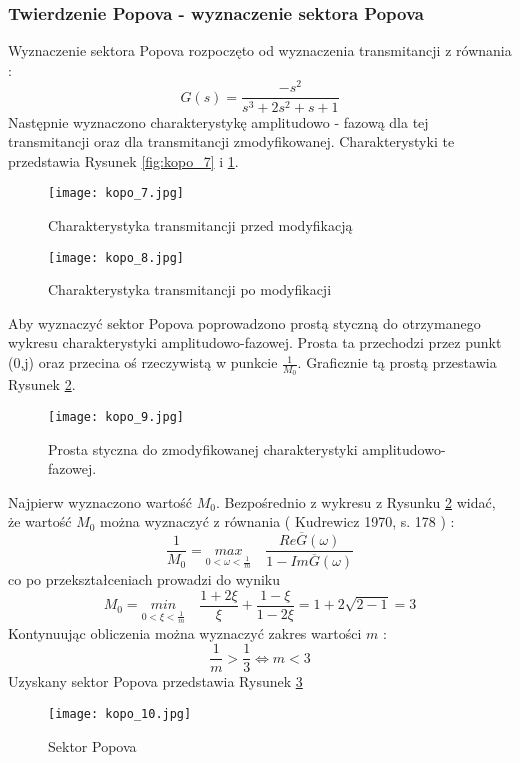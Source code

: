 \documentclass[a4paper,11pt]{article}
\begin{document}
\subsubsection{Twierdzenie Popova - wyznaczenie sektora Popova}
Wyznaczenie sektora Popova rozpoczęto od wyznaczenia transmitancji z równania : 
\begin{equation*}
G(s) = \frac{-s^{2}}{s^{3}+2s^{2}+s+1}
\end{equation*}
Następnie wyznaczono charakterystykę amplitudowo - fazową dla tej transmitancji oraz dla transmitancji zmodyfikowanej. 
Charakterystyki te przedstawia Rysunek \ref{fig:kopo_7} i \ref{fig:kopo_8}.
\begin{figure}[H]
  \centering
  \begin{minipage}[b]{0.47\textwidth}
    \texttt{[image: kopo\_7.jpg]}
    \caption{Charakterystyka transmitancji przed modyfikacją}
    \label{fig:kopo_7}
  \end{minipage}
  \hfill
  \begin{minipage}[b]{0.47\textwidth}
    \texttt{[image: kopo\_8.jpg]}
    \caption{Charakterystyka transmitancji po modyfikacji}
    \label{fig:kopo_8}
  \end{minipage}
\end{figure}
Aby wyznaczyć sektor Popova poprowadzono prostą styczną do otrzymanego wykresu charakterystyki amplitudowo-fazowej. Prosta ta przechodzi przez punkt (0,j) oraz przecina oś rzeczywistą w punkcie \( \frac{1}{M_{0}} \). Graficznie tą prostą przestawia Rysunek \ref{fig:kopo_9}.
\begin{figure}[H]
\centerline{\texttt{[image: kopo\_9.jpg]}}
\centering
\caption{Prosta styczna do zmodyfikowanej charakterystyki amplitudowo-fazowej.  }
\label{fig:kopo_9}
\end{figure}
Najpierw wyznaczono wartość \( M_{0} \). Bezpośrednio z wykresu z Rysunku \ref{fig:kopo_9} widać, że wartość \( M_{0} \) można wyznaczyć z równania ( Kudrewicz 1970, s. 178 ) :
\begin{equation*}
\frac{1}{M_{0}}=\underset{0<\omega< \frac{1}{m}}{max} \quad \frac{Re\overline{G}(\omega)}{1-Im\overline{G}(\omega)}
\end{equation*}
co po przekształceniach prowadzi do wyniku 
\begin{equation*}
M_{0}=\underset{0<\xi< \frac{1}{m}}{min} \quad \frac{1+2\xi}{\xi}+\frac{1-\xi}{1-2\xi}=1+2\sqrt{2-1} = 3
\end{equation*}
Kontynuując obliczenia można wyznaczyć zakres wartości \( m \) :
\begin{equation*}
\frac{1}{m}>\frac{1}{3} \Leftrightarrow m < 3
\end{equation*}
Uzyskany sektor Popova przedstawia Rysunek \ref{fig:kopo_10}
\begin{figure}[H]
\centerline{\texttt{[image: kopo\_10.jpg]}}
\centering
\caption{Sektor Popova}
\label{fig:kopo_10}
\end{figure}
\end{document}
